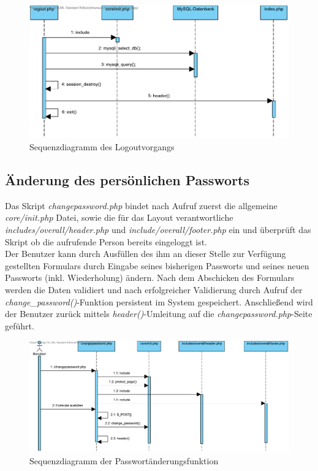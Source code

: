 \documentclass[fontsize = 12pt, paper = a4]{scrreprt}
\begin{document}
\begin{figure}[h]
\centering
\includegraphics[scale = 0.7]{logout}
\caption[Sequenzdiagramm des Logoutvorgangs]{Sequenzdiagramm des Logoutvorgangs}
\label{logout}
\end{figure}

\newpage
\subsection{Änderung des persönlichen Passworts}
Das Skript \textit{changepassword.php} bindet nach Aufruf zuerst die allgemeine \textit{core/init.php} Datei, sowie die für das Layout verantwortliche \textit{includes/overall/header.php} und \textit{include/overall/footer.php} ein und überprüft das Skript ob die aufrufende Person bereits eingeloggt ist.\\
Der Benutzer kann durch Ausfüllen des ihm an dieser Stelle zur Verfügung gestellten Formulars durch Eingabe seines bisherigen Passworts und seines neuen Passworts (inkl. Wiederholung) ändern. Nach dem Abschicken des Formulars werden die Daten validiert und nach erfolgreicher Validierung durch Aufruf der \textit{change\_password()}-Funktion persistent im System gespeichert. Anschließend wird der Benutzer zurück mittels \textit{header()}-Umleitung auf die \textit{changepassword.php}-Seite geführt.

\begin{figure}[h]
\centering
\includegraphics[scale = 0.6]{passwort}
\caption[Sequenzdiagramm der Passwort\"{a}nderungsfunktion]{Sequenzdiagramm der Passwort\"{a}nderungsfunktion}
\label{passwort}
\end{figure}
\end{document}
